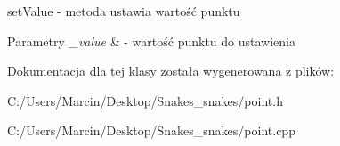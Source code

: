 set\+Value -\/ metoda ustawia wartość punktu 


\begin{DoxyParams}{Parametry}
{\em \+\_\+value} & -\/ wartość punktu do ustawienia \\
\hline
\end{DoxyParams}


Dokumentacja dla tej klasy została wygenerowana z plików\+:\begin{DoxyCompactItemize}
\item 
C\+:/\+Users/\+Marcin/\+Desktop/\+Snakes\+\_\+snakes/point.\+h\item 
C\+:/\+Users/\+Marcin/\+Desktop/\+Snakes\+\_\+snakes/point.\+cpp\end{DoxyCompactItemize}
